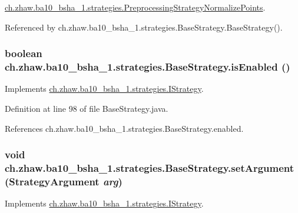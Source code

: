 \hyperlink{classch_1_1zhaw_1_1ba10__bsha__1_1_1strategies_1_1PreprocessingStrategyNormalizePoints_a0c81b7ac2ba72e201512d5f6de524e14}{ch.zhaw.ba10\_\-bsha\_\-1.strategies.PreprocessingStrategyNormalizePoints}.

Referenced by ch.zhaw.ba10\_\-bsha\_\-1.strategies.BaseStrategy.BaseStrategy().\hypertarget{classch_1_1zhaw_1_1ba10__bsha__1_1_1strategies_1_1BaseStrategy_ad8e0e57f59a0ca49b27f205a39f2b8ae}{
\subsubsection[{isEnabled}]{\setlength{\rightskip}{0pt plus 5cm}boolean ch.zhaw.ba10\_\-bsha\_\-1.strategies.BaseStrategy.isEnabled ()}}
\label{classch_1_1zhaw_1_1ba10__bsha__1_1_1strategies_1_1BaseStrategy_ad8e0e57f59a0ca49b27f205a39f2b8ae}


Implements \hyperlink{interfacech_1_1zhaw_1_1ba10__bsha__1_1_1strategies_1_1IStrategy_a64149a1aad4d39dde043d11b2e7cc673}{ch.zhaw.ba10\_\-bsha\_\-1.strategies.IStrategy}.

Definition at line 98 of file BaseStrategy.java.

References ch.zhaw.ba10\_\-bsha\_\-1.strategies.BaseStrategy.enabled.\hypertarget{classch_1_1zhaw_1_1ba10__bsha__1_1_1strategies_1_1BaseStrategy_ad1b20c8f3f41126c9e6cef52d3f30bbe}{
\subsubsection[{setArgument}]{\setlength{\rightskip}{0pt plus 5cm}void ch.zhaw.ba10\_\-bsha\_\-1.strategies.BaseStrategy.setArgument ({\bf StrategyArgument} {\em arg})}}
\label{classch_1_1zhaw_1_1ba10__bsha__1_1_1strategies_1_1BaseStrategy_ad1b20c8f3f41126c9e6cef52d3f30bbe}


Implements \hyperlink{interfacech_1_1zhaw_1_1ba10__bsha__1_1_1strategies_1_1IStrategy_aa5cbdd49578bcc84207fc073bc91da99}{ch.zhaw.ba10\_\-bsha\_\-1.strategies.IStrategy}.

